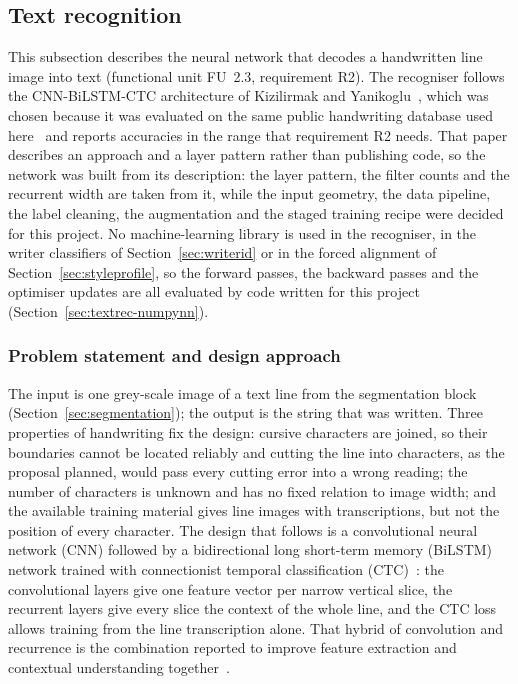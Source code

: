 \subsection{Text recognition}
\label{sec:textrec}

This subsection describes the neural network that decodes a handwritten line image into text (functional unit FU~2.3, requirement R2).
The recogniser follows the CNN-BiLSTM-CTC architecture of Kizilirmak and Yanikoglu~\cite{kizilirmak2023}, which was chosen because it was evaluated on the same public handwriting database used here~\cite{marti2002} and reports accuracies in the range that requirement R2 needs.
That paper describes an approach and a layer pattern rather than publishing code, so the network was built from its description: the layer pattern, the filter counts and the recurrent width are taken from it, while the input geometry, the data pipeline, the label cleaning, the augmentation and the staged training recipe were decided for this project.
No machine-learning library is used in the recogniser, in the writer classifiers of Section~\ref{sec:writerid} or in the forced alignment of Section~\ref{sec:styleprofile}, so the forward passes, the backward passes and the optimiser updates are all evaluated by code written for this project (Section~\ref{sec:textrec-numpynn}).

\subsubsection{Problem statement and design approach}

The input is one grey-scale image of a text line from the segmentation block (Section~\ref{sec:segmentation}); the output is the string that was written.
Three properties of handwriting fix the design: cursive characters are joined, so their boundaries cannot be located reliably and cutting the line into characters, as the proposal planned, would pass every cutting error into a wrong reading; the number of characters is unknown and has no fixed relation to image width; and the available training material gives line images with transcriptions, but not the position of every character.
The design that follows is a convolutional neural network (CNN) followed by a bidirectional long short-term memory (BiLSTM) network trained with connectionist temporal classification (CTC)~\cite{graves2006}: the convolutional layers give one feature vector per narrow vertical slice, the recurrent layers give every slice the context of the whole line, and the CTC loss allows training from the line transcription alone.
That hybrid of convolution and recurrence is the combination reported to improve feature extraction and contextual understanding together~\cite{kumar2024,ma2023}.

